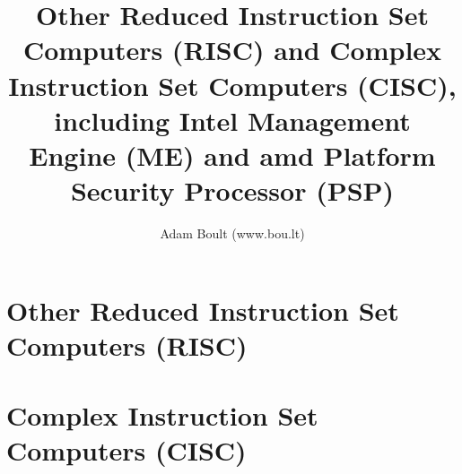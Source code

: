 \documentclass[oneside]{book}
\begin{document}
\author{Adam Boult (www.bou.lt)}
\title{Other Reduced Instruction Set Computers (RISC) and Complex Instruction Set Computers (CISC), including Intel Management Engine (ME) and amd Platform Security Processor (PSP)}
\maketitle

\setcounter{tocdepth}{0}
\tableofcontents



\part{Other Reduced Instruction Set Computers (RISC)}








\part{Complex Instruction Set Computers (CISC)}






\end{document}
